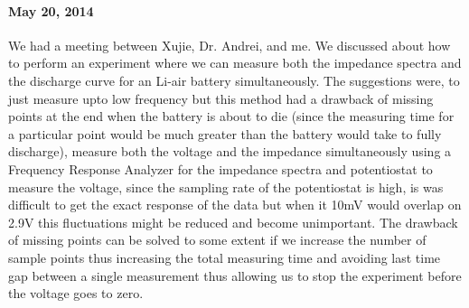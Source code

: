\documentclass[12pt]{book}
\begin{document}
\paragraph*{May 20, 2014}
We had a meeting between Xujie, Dr. Andrei, and me. We discussed about how to perform an experiment where we can measure both the impedance spectra and the discharge curve for an Li-air battery simultaneously. The suggestions were, to just measure upto low frequency but this method had a drawback of missing points at the end when the battery is about to die (since the measuring time for a particular point would be much greater than the battery would take to fully discharge), measure both the voltage and the impedance simultaneously using a Frequency Response Analyzer for the impedance spectra and potentiostat to measure the voltage, since the sampling rate of the potentiostat is high, is was difficult to get the exact response of the data but when it 10mV would overlap on 2.9V this fluctuations might be reduced and become unimportant. The drawback of missing points can be solved to some extent if we increase the number of sample points thus increasing the total measuring time and avoiding last time gap between a single measurement thus allowing us to stop the experiment before the voltage goes to zero. 
\end{document}
